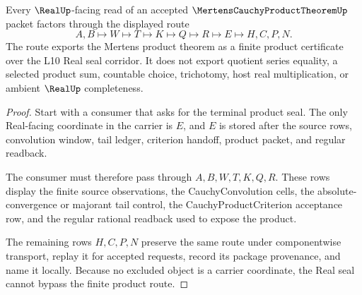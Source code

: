 \begin{theorem}
\label{thm:mertens-cauchy-product-theorem-real-seal-route}
Every $\RealUp$-facing read of an accepted $\MertensCauchyProductTheoremUp$ packet factors through the displayed route
$$
A,B\longmapsto W\longmapsto T\longmapsto K\longmapsto Q\longmapsto R\longmapsto E\longmapsto H,C,P,N .
$$
The route exports the Mertens product theorem as a finite product certificate over the L10 Real seal corridor. It does not export quotient series equality, a selected product sum, countable choice, trichotomy, host real multiplication, or ambient $\RealUp$ completeness.
\end{theorem}
\begin{proof}
Start with a consumer that asks for the terminal product seal. The only Real-facing coordinate in the carrier is $E$, and $E$ is stored after the source rows, convolution window, tail ledger, criterion handoff, product packet, and regular readback.

The consumer must therefore pass through $A,B,W,T,K,Q,R$. These rows display the finite source observations, the CauchyConvolution cells, the absolute-convergence or majorant tail control, the CauchyProductCriterion acceptance row, and the regular rational readback used to expose the product.

The remaining rows $H,C,P,N$ preserve the same route under componentwise transport, replay it for accepted requests, record its package provenance, and name it locally. Because no excluded object is a carrier coordinate, the Real seal cannot bypass the finite product route.
\end{proof}

